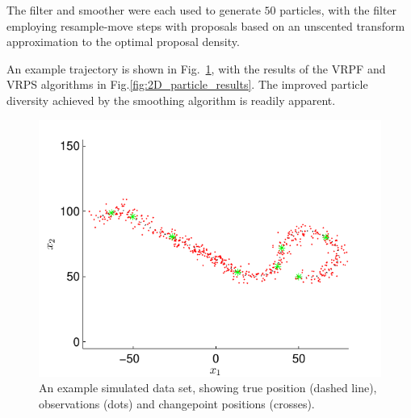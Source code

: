 \documentclass[10pt,twocolumn,twoside]{IEEEtran}
\begin{document}
The filter and smoother were each used to generate $50$ particles, with the filter employing resample-move steps with proposals based on an unscented transform \cite{Julier2004} approximation to the optimal proposal density.

An example trajectory is shown in Fig.~\ref{fig:simulated_trajectory}, with the results of the VRPF and VRPS algorithms in Fig.\ref{fig:2D_particle_results}. The improved particle diversity achieved by the smoothing algorithm is readily apparent.

\begin{figure}[!t]
\centering
\includegraphics[width=0.9\columnwidth]{simulated_problem.pdf}
\caption{An example simulated data set, showing true position (dashed line), observations (dots) and changepoint positions (crosses). }
\label{fig:simulated_trajectory}
\end{figure}
\end{document}
